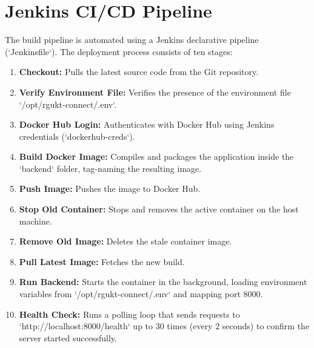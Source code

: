 \section{Jenkins CI/CD Pipeline}
The build pipeline is automated using a Jenkins declarative pipeline (`Jenkinsfile`). The deployment process consists of ten stages:
\begin{enumerate}
    \item \textbf{Checkout:} Pulls the latest source code from the Git repository.
    \item \textbf{Verify Environment File:} Verifies the presence of the environment file `/opt/rgukt-connect/.env`.
    \item \textbf{Docker Hub Login:} Authenticates with Docker Hub using Jenkins credentials (`dockerhub-creds`).
    \item \textbf{Build Docker Image:} Compiles and packages the application inside the `backend` folder, tag-naming the resulting image.
    \item \textbf{Push Image:} Pushes the image to Docker Hub.
    \item \textbf{Stop Old Container:} Stops and removes the active container on the host machine.
    \item \textbf{Remove Old Image:} Deletes the stale container image.
    \item \textbf{Pull Latest Image:} Fetches the new build.
    \item \textbf{Run Backend:} Starts the container in the background, loading environment variables from `/opt/rgukt-connect/.env` and mapping port 8000.
    \item \textbf{Health Check:} Runs a polling loop that sends requests to `http://localhost:8000/health` up to 30 times (every 2 seconds) to confirm the server started successfully.
\end{enumerate}
